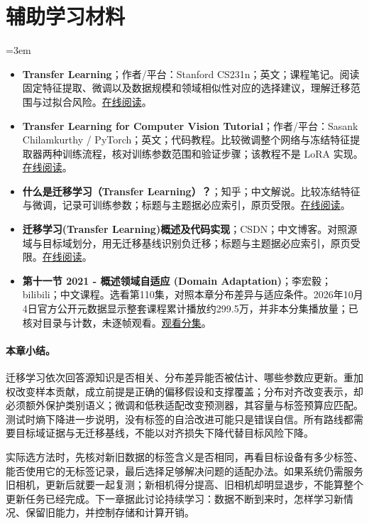 \section*{辅助学习材料}
\begingroup
\emergencystretch=3em
\begin{itemize}
\item \textbf{Transfer Learning}；作者/平台：Stanford CS231n；英文；课程笔记。阅读固定特征提取、微调以及数据规模和领域相似性对应的选择建议，理解迁移范围与过拟合风险。\href{https://cs231n.github.io/transfer-learning/}{在线阅读}。
\item \textbf{Transfer Learning for Computer Vision Tutorial}；作者/平台：Sasank Chilamkurthy / PyTorch；英文；代码教程。比较微调整个网络与冻结特征提取器两种训练流程，核对训练参数范围和验证步骤；该教程不是 LoRA 实现。\href{https://docs.pytorch.org/tutorials/beginner/transfer\_learning\_tutorial.html}{在线阅读}。
\item \textbf{什么是迁移学习（Transfer Learning）？}；知乎；中文解说。比较冻结特征与微调，记录可训练参数；标题与主题据必应索引，原页受限。\href{https://zhuanlan.zhihu.com/p/1899236885408256815}{在线阅读}。
\item \textbf{迁移学习(Transfer Learning)概述及代码实现}；CSDN；中文博客。对照源域与目标域划分，用无迁移基线识别负迁移；标题与主题据必应索引，原页受限。\href{https://blog.csdn.net/weixin\_49272172/article/details/115791703}{在线阅读}。
\item \textbf{第十一节 2021 - 概述领域自适应 (Domain Adaptation)}；李宏毅；bilibili；中文课程。选看第110集，对照本章分布差异与适应条件。2026年10月4日官方公开元数据显示整套课程累计播放约299.5万，并非本分集播放量；已核对目录与计数，未逐帧观看。\href{https://www.bilibili.com/video/BV1Wv411h7kN/?p=110}{观看分集}。
\end{itemize}
\endgroup
\paragraph{本章小结。}
迁移学习依次回答源知识是否相关、分布差异能否被估计、哪些参数应更新。重加权改变样本贡献，成立前提是正确的偏移假设和支撑覆盖；分布对齐改变表示，却必须额外保护类别语义；微调和低秩适配改变预测器，其容量与标签预算应匹配。测试时熵下降进一步说明，没有标签的自洽改进可能只是错误自信。所有路线都需要目标域证据与无迁移基线，不能以对齐损失下降代替目标风险下降。

实际选方法时，先核对新旧数据的标签含义是否相同，再看目标设备有多少标签、能否使用它的无标签记录，最后选择足够解决问题的适配办法。如果系统仍需服务旧相机，更新后就要一起复测；新相机得分提高、旧相机却明显退步，不能算整个更新任务已经完成。下一章据此讨论持续学习：数据不断到来时，怎样学习新情况、保留旧能力，并控制存储和计算开销。
